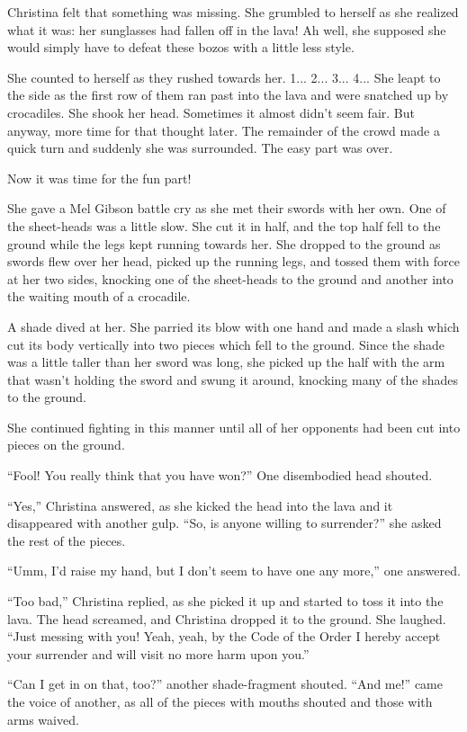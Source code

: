 \documentclass[showtrims,b6paper,draft,10pt]{memoir}
\begin{document}
Christina felt that something was missing.  She grumbled to herself as she realized what it was:  her sunglasses had fallen off in the lava!  Ah well, she supposed she would simply have to defeat these bozos with a little less style.

She counted to herself as they rushed towards her.  1... 2... 3... 4...  She leapt to the side as the first row of them ran past into the lava and were snatched up by crocadiles.  She shook her head.  Sometimes it almost didn't seem fair.  But anyway, more time for that thought later.  The remainder of the crowd made a quick turn and suddenly she was surrounded.    The easy part was over.

Now it was time for the fun part!

She gave a Mel Gibson battle cry as she met their swords with her own.  One of the sheet-heads was a little slow.  She cut it in half, and the top half fell to the ground while the legs kept running towards her.  She dropped to the ground as swords flew over her head, picked up the running legs, and tossed them with force at her two sides, knocking one of the sheet-heads to the ground and another into the waiting mouth of a crocadile.

A shade dived at her.  She parried its blow with one hand and made a slash which cut its body vertically into two pieces which fell to the ground.  Since the shade was a little taller than her sword was long, she picked up the half with the arm that wasn't holding the sword and swung it around, knocking many of the shades to the ground.

She continued fighting in this manner until all of her opponents had been cut into pieces on the ground.

``Fool!  You really think that you have won?''  One disembodied head shouted.

``Yes,''  Christina answered, as she kicked the head into the lava and it disappeared with another gulp.  ``So, is anyone willing to surrender?''  she asked the rest of the pieces.

``Umm, I'd raise my hand, but I don't seem to have one any more,'' one answered.

``Too bad,'' Christina replied, as she picked it up and started to toss it into the lava.  The head screamed, and Christina dropped it to the ground.  She laughed.  ``Just messing with you!  Yeah, yeah, by the Code of the Order I hereby accept your surrender and will visit no more harm upon you.''

``Can I get in on that, too?''  another shade-fragment shouted.  ``And me!'' came the voice of another, as all of the pieces with mouths shouted and those with arms waived.
\end{document}
